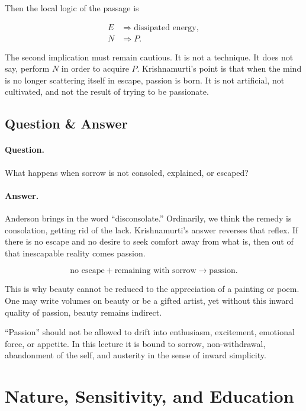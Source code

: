 Then the local logic of the passage is

\begin{align}
E &\Rightarrow \text{dissipated energy},\\
N &\Rightarrow P.
\end{align}

The second implication must remain cautious. It is not a technique. It does not say, perform \(N\) in order to acquire \(P\). Krishnamurti's point is that when the mind is no longer scattering itself in escape, passion is born. It is not artificial, not cultivated, and not the result of trying to be passionate.

\subsection{Question \& Answer}

\paragraph{Question.}
What happens when sorrow is not consoled, explained, or escaped?

\paragraph{Answer.}
Anderson brings in the word ``disconsolate.'' Ordinarily, we think the remedy is consolation, getting rid of the lack. Krishnamurti's answer reverses that reflex. If there is no escape and no desire to seek comfort away from what is, then out of that inescapable reality comes passion.

\begin{equation}
\text{no escape}
+
\text{remaining with sorrow}
\longrightarrow
\text{passion}.
\end{equation}

This is why beauty cannot be reduced to the appreciation of a painting or poem. One may write volumes on beauty or be a gifted artist, yet without this inward quality of passion, beauty remains indirect.

\begin{remark}
``Passion'' should not be allowed to drift into enthusiasm, excitement, emotional force, or appetite. In this lecture it is bound to sorrow, non-withdrawal, abandonment of the self, and austerity in the sense of inward simplicity.
\end{remark}

\section{Nature, Sensitivity, and Education}

